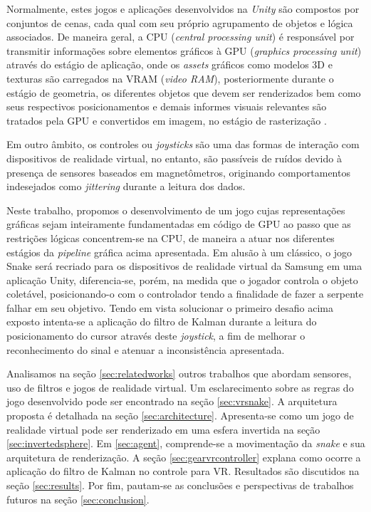 \documentclass[conference]{IEEEtran}
\begin{document}
Normalmente, estes jogos e aplicações desenvolvidos na \textit{Unity} são compostos por conjuntos de cenas, cada qual com seu próprio agrupamento de objetos e lógica associados. De maneira geral, a CPU (\textit{central processing unit}) é responsável por transmitir informações sobre elementos gráficos à GPU (\textit{graphics processing unit}) através do estágio de aplicação, onde os \textit{assets} gráficos como modelos 3D e texturas são carregados na VRAM (\textit{video RAM}), posteriormente durante o estágio de geometria, os diferentes objetos que devem ser renderizados bem como seus respectivos posicionamentos e demais informes visuais relevantes são tratados pela GPU e convertidos em imagem, no estágio de rasterização \cite{akenine2008real}.

Em outro âmbito, os controles ou \textit{joysticks} são uma das formas de interação com dispositivos de realidade virtual, no entanto, são passíveis de ruídos devido à presença de sensores baseados em magnetômetros, originando comportamentos indesejados como \textit{jittering} durante a leitura dos dados.

Neste trabalho, propomos o desenvolvimento de um jogo cujas representações gráficas sejam inteiramente fundamentadas em código de GPU ao passo que as restrições lógicas concentrem-se na CPU, de maneira a atuar nos diferentes estágios da \textit{pipeline} gráfica acima apresentada. Em alusão à um clássico, o jogo Snake será recriado para os dispositivos de realidade virtual da Samsung em uma aplicação Unity, diferencia-se, porém, na medida que o jogador controla o objeto coletável, posicionando-o com o controlador tendo a finalidade de fazer a serpente falhar em seu objetivo. Tendo em vista solucionar o primeiro desafio acima exposto intenta-se a aplicação do filtro de Kalman durante a leitura do posicionamento do cursor através deste \textit{joystick}, a fim de melhorar o reconhecimento do sinal e atenuar a inconsistência apresentada.

Analisamos na seção \ref{sec:relatedworks} outros trabalhos que abordam sensores, uso de filtros e jogos de realidade virtual. Um esclarecimento sobre as regras do jogo desenvolvido pode ser encontrado na seção \ref{sec:vrsnake}. A arquitetura proposta é detalhada na seção \ref{sec:architecture}. Apresenta-se como um jogo de realidade virtual pode ser renderizado em uma esfera invertida na seção \ref{sec:invertedsphere}. Em \ref{sec:agent}, comprende-se a movimentação da \textit{snake} e sua arquitetura de renderização. A seção \ref{sec:gearvrcontroller} explana como ocorre a aplicação do filtro de Kalman no controle para VR. Resultados são discutidos na seção \ref{sec:results}. Por fim, pautam-se as conclusões e perspectivas de trabalhos futuros na seção \ref{sec:conclusion}.
\end{document}
